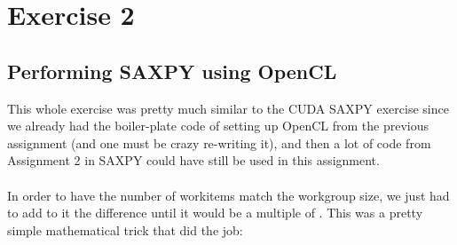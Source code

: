 \documentclass[english]{exam}
\begin{document}
\clearpage
\chapter{Exercise 2}
\section*{Performing SAXPY using OpenCL}

This whole exercise was pretty much similar to the CUDA SAXPY exercise since we already had the boiler-plate code of setting up OpenCL from the previous assignment (and one must be crazy re-writing it), and then a lot of code from Assignment 2 in SAXPY could have still be used in this assignment.
\\\\
In order to have the number of workitems match the workgroup size, we just had to add to it the difference until it would be a multiple of . This was a pretty simple mathematical trick that did the job: 
\end{document}
